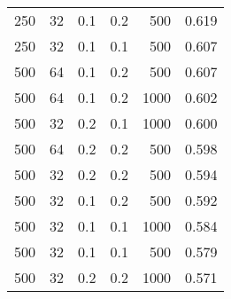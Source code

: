 \begin{table}[H]
\begin{tabular}{c|c|c|c|r|c}
    250                                & 32                             & 0.1                         & 0.2                                  & 500                                 & 0.619                  \\
    250                                & 32                             & 0.1                         & 0.1                                  & 500                                 & 0.607                  \\
    500                                & 64                             & 0.1                         & 0.2                                  & 500                                 & 0.607                  \\
    500                                & 64                             & 0.1                         & 0.2                                  & 1000                                & 0.602                  \\
    500                                & 32                             & 0.2                         & 0.1                                  & 1000                                & 0.600                  \\
    500                                & 64                             & 0.2                         & 0.2                                  & 500                                 & 0.598                  \\
    500                                & 32                             & 0.2                         & 0.2                                  & 500                                 & 0.594                  \\
    500                                & 32                             & 0.1                         & 0.2                                  & 500                                 & 0.592                  \\
    500                                & 32                             & 0.1                         & 0.1                                  & 1000                                & 0.584                  \\
    500                                & 32                             & 0.1                         & 0.1                                  & 500                                 & 0.579                  \\
    500                                & 32                             & 0.2                         & 0.2                                  & 1000                                & 0.571                  \\

\end{tabular}
\end{table}

